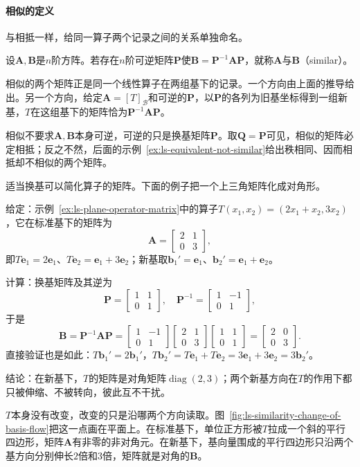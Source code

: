 \paragraph{相似的定义}
\label{sec:ls-similarity-meaning}
与相抵一样，给同一算子两个记录之间的关系单独命名。
\begin{definition}[矩阵相似]
\label{def:ls-matrix-similarity}
设$\bm A,\bm B$是$n$阶方阵。若存在$n$阶可逆矩阵$\bm P$使$\bm B=\bm P^{-1}\bm A\bm P$，就称$\bm A$与$\bm B$（similar）。
\end{definition}
相似的两个矩阵正是同一个线性算子在两组基下的记录。一个方向由上面的推导给出。另一个方向，给定$\bm A=[T]_{\mathcal B}$和可逆的$\bm P$，以$\bm P$的各列为旧基坐标得到一组新基，$T$在这组基下的矩阵恰为$\bm P^{-1}\bm A\bm P$。

相似不要求$\bm A,\bm B$本身可逆，可逆的只是换基矩阵$\bm P$。取$\bm Q=\bm P$可见，相似的矩阵必定相抵；反之不然，后面的示例~\ref{ex:ls-equivalent-not-similar}给出秩相同、因而相抵却不相似的两个矩阵。

适当换基可以简化算子的矩阵。下面的例子把一个上三角矩阵化成对角形。
\begin{example}[换基把算子的矩阵化为对角形]
\label{ex:ls-similarity-diagonal}
给定：示例~\ref{ex:ls-plane-operator-matrix}中的算子$T(x_1,x_2)=(2x_1+x_2,3x_2)$，它在标准基下的矩阵为
\[
 \bm A=\begin{bmatrix}2&1\\0&3\end{bmatrix},
\]
即$T\bm e_1=2\bm e_1$、$T\bm e_2=\bm e_1+3\bm e_2$；新基取$\bm b_1'=\bm e_1$、$\bm b_2'=\bm e_1+\bm e_2$。

计算：换基矩阵及其逆为
\[
 \bm P=\begin{bmatrix}1&1\\0&1\end{bmatrix},\quad
 \bm P^{-1}=\begin{bmatrix}1&-1\\0&1\end{bmatrix},
\]
于是
\[
 \bm B=\bm P^{-1}\bm A\bm P
 =\begin{bmatrix}1&-1\\0&1\end{bmatrix}
 \begin{bmatrix}2&1\\0&3\end{bmatrix}
 \begin{bmatrix}1&1\\0&1\end{bmatrix}
 =\begin{bmatrix}2&0\\0&3\end{bmatrix}.
\]
直接验证也是如此：$T\bm b_1'=2\bm b_1'$，$T\bm b_2'=T\bm e_1+T\bm e_2=3\bm e_1+3\bm e_2=3\bm b_2'$。

结论：在新基下，$T$的矩阵是对角矩阵$\operatorname{diag}(2,3)$；两个新基方向在$T$的作用下都只被伸缩、不被转向，彼此互不干扰。
\end{example}
$T$本身没有改变，改变的只是沿哪两个方向读取。图~\ref{fig:ls-similarity-change-of-basis-flow}把这一点画在平面上。在标准基下，单位正方形被$T$拉成一个斜的平行四边形，矩阵$\bm A$有非零的非对角元。在新基下，基向量围成的平行四边形只沿两个基方向分别伸长$2$倍和$3$倍，矩阵就是对角的$\bm B$。

